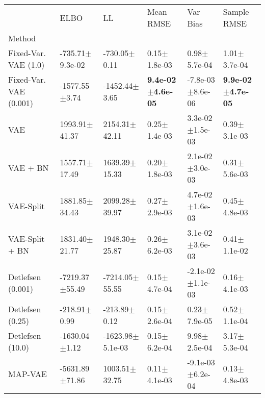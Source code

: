 \begin{tabular}{llllll}
\toprule
{} &                        ELBO &                          LL &                     Mean RMSE &                      Var Bias &                   Sample RMSE \\
Method                 &                             &                             &                               &                               &                               \\
\midrule
Fixed-Var. VAE (1.0)   &         -735.71$\pm$9.3e-02 &            -730.05$\pm$0.11 &              0.15$\pm$1.8e-03 &              0.98$\pm$5.7e-04 &              1.01$\pm$3.7e-04 \\
Fixed-Var. VAE (0.001) &           -1577.55$\pm$3.74 &           -1452.44$\pm$3.65 &  \textbf{9.4e-02$\pm$4.6e-05} &          -7.8e-03$\pm$8.6e-06 &  \textbf{9.9e-02$\pm$4.7e-05} \\
VAE                    &           1993.91$\pm$41.37 &           2154.31$\pm$42.11 &              0.25$\pm$1.4e-03 &           3.3e-02$\pm$1.5e-03 &              0.39$\pm$3.1e-03 \\
VAE + BN               &           1557.71$\pm$17.49 &           1639.39$\pm$15.33 &              0.20$\pm$1.8e-03 &           2.1e-02$\pm$3.0e-03 &              0.31$\pm$5.6e-03 \\
VAE-Split              &           1881.85$\pm$34.43 &           2099.28$\pm$39.97 &              0.27$\pm$2.9e-03 &           4.7e-02$\pm$1.6e-03 &              0.45$\pm$4.8e-03 \\
VAE-Split + BN         &           1831.40$\pm$21.77 &           1948.30$\pm$25.87 &              0.26$\pm$6.2e-03 &           3.1e-02$\pm$3.6e-03 &              0.41$\pm$1.1e-02 \\
Detlefsen (0.001)      &          -7219.37$\pm$55.49 &          -7214.05$\pm$55.55 &              0.15$\pm$4.7e-04 &          -2.1e-02$\pm$1.1e-03 &              0.16$\pm$4.1e-03 \\
Detlefsen (0.25)       &            -218.91$\pm$0.99 &            -213.89$\pm$0.12 &              0.15$\pm$2.6e-04 &              0.23$\pm$7.9e-05 &              0.52$\pm$1.1e-04 \\
Detlefsen (10.0)       &           -1630.04$\pm$1.12 &        -1623.98$\pm$5.1e-03 &              0.15$\pm$6.2e-04 &              9.98$\pm$2.5e-04 &              3.17$\pm$5.3e-04 \\
MAP-VAE                &          -5631.89$\pm$71.86 &           1003.51$\pm$32.75 &              0.11$\pm$4.1e-03 &          -9.1e-03$\pm$6.2e-04 &              0.13$\pm$4.8e-03 \\

\end{tabular}
